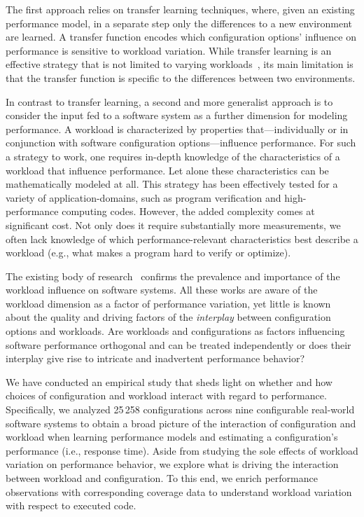 The first approach relies on transfer learning techniques, where, given an existing performance model, in a separate step only the differences to a new environment are learned. A transfer function encodes which configuration options’ influence on performance is sensitive to workload variation. While transfer learning is an effective strategy that is not limited to varying workloads~\cite{jamshidi_learning_2018,jamishidi_transfer_2017,jamshidi_transfer_gp_2017,martin_transfer_2021,ding_bayesian_2020}, its main limitation is that the transfer function is specific to the differences between two environments.

In contrast to transfer learning, a second and more generalist approach is to consider the input fed to a software system as a further dimension for modeling performance. A workload is characterized by properties that---individually or in conjunction with software configuration options---influence performance. For such a strategy to work, one requires in-depth knowledge of the characteristics of a workload that influence performance. Let alone these characteristics can be mathematically modeled at all. This strategy has been effectively tested for a  variety of application-domains, such as program verification and high-performance computing codes. However, the added complexity comes at significant cost. 
Not only does it require substantially more measurements, we often lack knowledge of which performance-relevant characteristics best describe a workload (e.g., what makes a program hard to verify or optimize).

The existing body of research~\cite{dorn2020,siegmundPerformanceinfluenceModelsHighly2015,haDeepPerf2019,perfAL,guoVariabilityawarePerformancePrediction2013,sarkarCostEfficientSamplingPerformance,guo_2018_data,fourier_learning_2015,perLasso,chen_hinnperf_2022,chen_mmo_2021,nairUsingBadLearners2017,nairFlash18,ohFindingNearoptimalConfigurations2017} confirms the prevalence and importance of the workload influence on software systems. All these works are aware of the workload dimension as a factor of performance variation, yet little is known about the quality and driving factors of the \emph{interplay} between configuration options and workloads. Are workloads and configurations as factors influencing software performance orthogonal and can be treated independently or does their interplay give rise to intricate and inadvertent performance behavior?

We have conducted an empirical study that sheds light on whether and how choices of configuration and workload interact with regard to performance. 
Specifically, we analyzed 25\,258 configurations across nine configurable real-world software systems to obtain a broad picture of the interaction of configuration and workload when learning performance models and estimating a configuration's performance (i.e., response time). Aside from studying the sole effects of workload variation on performance behavior, we explore what is driving the interaction between workload and configuration. To this end, we enrich performance observations with corresponding coverage data to understand workload variation with respect to executed code.

